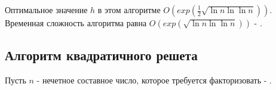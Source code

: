   Оптимальное значение $h$ в этом алгоритме $O(exp(\frac{1}{2}\sqrt{\ln{n}\ln{\ln{n}}}))$. Временная сложность 
  алгоритма равна $O(exp(\sqrt{\ln{n}\ln{\ln{n}}}))$ - \cite[Глава 4, страницы 115-142]{ish11}.

  \subsection{Алгоритм квадратичного решета}
  Пусть {$n$} - нечетное составное число, которое требуется факторизовать - \cite[Глава 4, страница 115-145-225]{ish11}.

